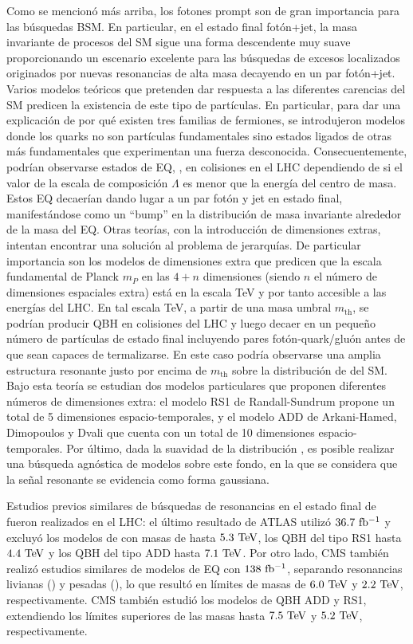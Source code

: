 Como se mencionó más arriba, los fotones prompt son de gran importancia para las búsquedas \ac{BSM}. En particular, en el estado final fotón+jet, la masa invariante de procesos del \ac{SM} sigue una forma descendente muy suave proporcionando un escenario excelente para las búsquedas de excesos localizados originados por nuevas resonancias de alta masa decayendo en  un par fotón+jet. Varios modelos teóricos que pretenden dar respuesta a las diferentes carencias del \ac{SM} predicen la existencia de este tipo de partículas. En particular, para dar una explicación de por qué existen tres familias de fermiones, se introdujeron modelos donde los quarks no son partículas fundamentales sino estados ligados de otras más fundamentales que experimentan una fuerza desconocida. Consecuentemente, podrían observarse estados de \ac{EQ}, \qstar,  en colisiones \pp en el \ac{LHC} dependiendo de si el valor de la escala de composición \(\Lambda\) es menor que la energía del centro de masa. Estos \ac{EQ} decaerían dando lugar a un par fotón y jet en estado final, manifestándose como un \enquote{bump} en la distribución de masa invariante \myj alrededor de la masa del \ac{EQ}. Otras teorías, con la introducción de dimensiones extras, intentan encontrar una solución al problema de jerarquías. De particular importancia son los modelos de dimensiones extra que predicen que la escala fundamental de Planck \(m_P\) en las \(4 + n\) dimensiones (siendo \(n\) el número de dimensiones espaciales extra) está en la escala TeV y por tanto accesible a las energías del \ac{LHC}. En tal escala TeV, a partir de una masa umbral \(m_{\text{th}}\), se podrían producir \ac{QBH} en colisiones \pp del \ac{LHC} y luego decaer en un pequeño número de partículas de estado final incluyendo pares fotón-quark/gluón antes de que sean capaces de termalizarse. En este caso podría observarse una amplia estructura resonante justo por encima de \(m_{\text{th}}\) sobre la distribución de \myj del \ac{SM}. Bajo esta teoría se estudian dos modelos particulares que proponen diferentes números de dimensiones extra: el modelo RS1 de Randall-Sundrum propone un total de 5 dimensiones espacio-temporales, y el modelo ADD de Arkani-Hamed, Dimopoulos y Dvali que cuenta con un total de 10 dimensiones espacio-temporales. Por último, dada la suavidad de la distribución \myj, es posible realizar una búsqueda agnóstica de modelos sobre este fondo, en la que se considera que la señal resonante se evidencia como forma gaussiana. 

Estudios previos similares de búsquedas de resonancias en el estado final de \gammajet fueron realizados en el \ac{LHC}: el último resultado de \ac{ATLAS} utilizó \(36.7~\ifb\) y excluyó los modelos de \qstar con masas de hasta \(5.3~\TeV\), los \ac{QBH} del tipo RS1 hasta \(4.4~\TeV\) y los \ac{QBH} del tipo ADD hasta \(7.1~\TeV\). Por otro lado, \ac{CMS} también realizó estudios similares de modelos de \ac{EQ} con \(138~\ifb\), separando resonancias livianas (\qstar) y pesadas (\bstar), lo que resultó en límites de masas de \(6.0~\TeV\) y \(2.2~\TeV\), respectivamente. \ac{CMS} también estudió los modelos de \ac{QBH} ADD y RS1, extendiendo los límites superiores de las masas hasta \(7.5~\TeV\) y \(5.2~\TeV\), respectivamente.

